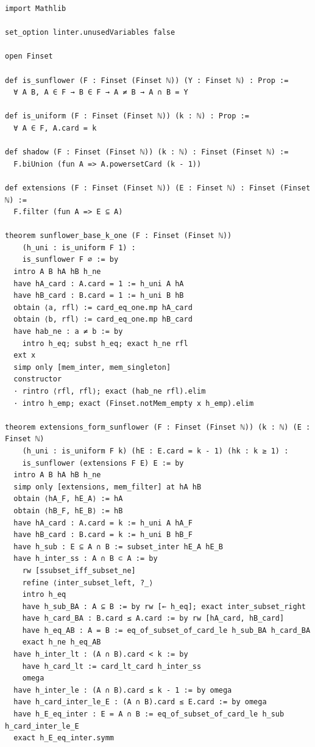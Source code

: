 \documentclass[11pt,a4paper]{article}
\theoremstyle{definition}
\begin{document}
\begin{lstlisting}[caption={Certified Lean 4 Code for the Sunflower and Extension Theorems}]
import Mathlib

set_option linter.unusedVariables false

open Finset

def is_sunflower (F : Finset (Finset ℕ)) (Y : Finset ℕ) : Prop :=
  ∀ A B, A ∈ F → B ∈ F → A ≠ B → A ∩ B = Y

def is_uniform (F : Finset (Finset ℕ)) (k : ℕ) : Prop :=
  ∀ A ∈ F, A.card = k

def shadow (F : Finset (Finset ℕ)) (k : ℕ) : Finset (Finset ℕ) :=
  F.biUnion (fun A => A.powersetCard (k - 1))

def extensions (F : Finset (Finset ℕ)) (E : Finset ℕ) : Finset (Finset ℕ) :=
  F.filter (fun A => E ⊆ A)

theorem sunflower_base_k_one (F : Finset (Finset ℕ))
    (h_uni : is_uniform F 1) :
    is_sunflower F ∅ := by
  intro A B hA hB h_ne
  have hA_card : A.card = 1 := h_uni A hA
  have hB_card : B.card = 1 := h_uni B hB
  obtain ⟨a, rfl⟩ := card_eq_one.mp hA_card
  obtain ⟨b, rfl⟩ := card_eq_one.mp hB_card
  have hab_ne : a ≠ b := by
    intro h_eq; subst h_eq; exact h_ne rfl
  ext x
  simp only [mem_inter, mem_singleton]
  constructor
  · rintro ⟨rfl, rfl⟩; exact (hab_ne rfl).elim
  · intro h_emp; exact (Finset.notMem_empty x h_emp).elim

theorem extensions_form_sunflower (F : Finset (Finset ℕ)) (k : ℕ) (E : Finset ℕ)
    (h_uni : is_uniform F k) (hE : E.card = k - 1) (hk : k ≥ 1) :
    is_sunflower (extensions F E) E := by
  intro A B hA hB h_ne
  simp only [extensions, mem_filter] at hA hB
  obtain ⟨hA_F, hE_A⟩ := hA
  obtain ⟨hB_F, hE_B⟩ := hB
  have hA_card : A.card = k := h_uni A hA_F
  have hB_card : B.card = k := h_uni B hB_F
  have h_sub : E ⊆ A ∩ B := subset_inter hE_A hE_B
  have h_inter_ss : A ∩ B ⊂ A := by
    rw [ssubset_iff_subset_ne]
    refine ⟨inter_subset_left, ?_⟩
    intro h_eq
    have h_sub_BA : A ⊆ B := by rw [← h_eq]; exact inter_subset_right
    have h_card_BA : B.card ≤ A.card := by rw [hA_card, hB_card]
    have h_eq_AB : A = B := eq_of_subset_of_card_le h_sub_BA h_card_BA
    exact h_ne h_eq_AB
  have h_inter_lt : (A ∩ B).card < k := by
    have h_card_lt := card_lt_card h_inter_ss
    omega
  have h_inter_le : (A ∩ B).card ≤ k - 1 := by omega
  have h_card_inter_le_E : (A ∩ B).card ≤ E.card := by omega
  have h_E_eq_inter : E = A ∩ B := eq_of_subset_of_card_le h_sub h_card_inter_le_E
  exact h_E_eq_inter.symm
\end{lstlisting}
\end{document}

